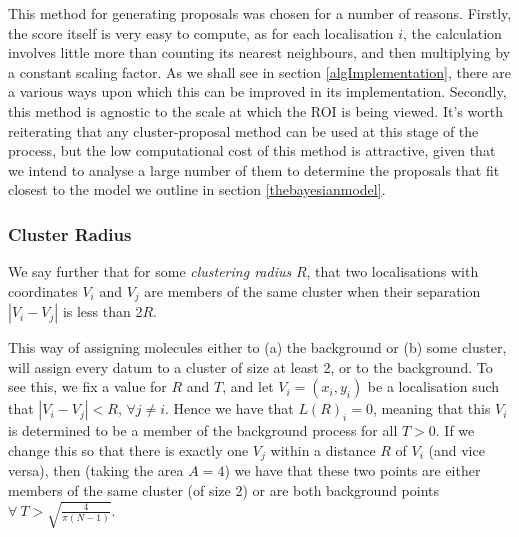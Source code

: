 \documentclass[11pt]{article}
\begin{document}

This method for generating proposals was chosen for a number of reasons. Firstly, the score itself is very easy to compute, as for each localisation $i$, the calculation involves little more than counting its nearest neighbours, and then multiplying by a constant scaling factor. As we shall see in section \ref{algImplementation}, there are a various ways upon which this can be improved in its implementation. Secondly, this method is agnostic to the scale at which the ROI is being viewed. It's worth reiterating that any cluster-proposal method can be used at this stage of the process, but the low computational cost of this method is attractive, given that we intend to analyse a large number of them to determine the proposals that fit closest to the model we outline in section \ref{thebayesianmodel}.


%
%


\subsubsection{Cluster Radius}
We say further that for some \textit{clustering radius} $R$, that two localisations with coordinates $V_i$ and $V_j$ are members of the same cluster when their separation $|V_i - V_j|$ is less than 2$R$. 


This way of assigning molecules either to (a) the background or (b) some cluster, will assign every datum to a cluster of size at least 2, or to the background. To see this,
we fix a value for $R$ and $T$, and let $V_i = (x_i, y_i)$ be a localisation such that $|V_i - V_j| < R$, $\forall j \neq i$. Hence we have that $L(R)_i = 0$, meaning that this $V_i$ is determined to be a member of the background process for all $T > 0$. If we change this so that there is exactly one $V_j$ within a distance $R$ of $V_i$ (and vice versa), then (taking the area $A = 4$) we have that these two points are either members of the same cluster (of size 2) or are both background points $\forall \ T > \sqrt{\frac{4}{\pi(N-1)}}$. \\
\end{document}
